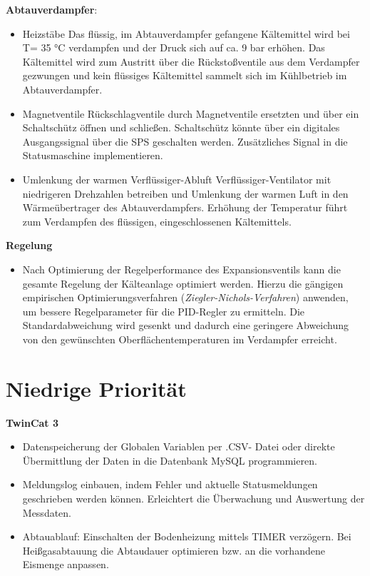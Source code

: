 \textbf{Abtauverdampfer}: 
	\begin{itemize}
\item  Heizstäbe \newline
Das flüssig, im Abtauverdampfer gefangene Kältemittel  wird bei T= 35 °C  verdampfen und der Druck sich auf ca. 9 bar erhöhen. Das Kältemittel wird zum Austritt über die Rückstoßventile aus dem Verdampfer gezwungen und kein flüssiges Kältemittel sammelt sich im Kühlbetrieb im Abtauverdampfer.


\item Magnetventile \newline
 Rückschlagventile durch Magnetventile ersetzten und über ein Schaltschütz öffnen und schließen. Schaltschütz könnte über ein digitales Ausgangssignal über die SPS geschalten werden. Zusätzliches Signal in die Statusmaschine implementieren. 

\item Umlenkung der warmen Verflüssiger-Abluft \newline
Verflüssiger-Ventilator mit niedrigeren Drehzahlen betreiben und Umlenkung der warmen Luft in den Wärmeübertrager des Abtauverdampfers. Erhöhung der Temperatur führt zum Verdampfen des flüssigen, eingeschlossenen Kältemittels. 
\end{itemize}	

\textbf{Regelung}
	\begin{itemize}
	\item Nach Optimierung der Regelperformance des Expansionsventils kann die gesamte Regelung der Kälteanlage optimiert werden. Hierzu die gängigen empirischen Optimierungsverfahren (\textit{Ziegler-Nichols-Verfahren}) anwenden, um bessere Regelparameter für die PID-Regler zu ermitteln. Die Standardabweichung wird gesenkt und dadurch eine geringere Abweichung von den gewünschten Oberflächentemperaturen im Verdampfer erreicht. 
	\end{itemize}

\section*{Niedrige Priorität}

\textbf{TwinCat 3} 
\begin{itemize}
\item Datenspeicherung der Globalen Variablen per .CSV- Datei oder direkte Übermittlung der Daten in die Datenbank MySQL programmieren. 
\item Meldungslog einbauen, indem Fehler und aktuelle Statusmeldungen geschrieben werden können. Erleichtert die Überwachung und Auswertung der Messdaten.
\item Abtauablauf: Einschalten der Bodenheizung mittels TIMER verzögern. Bei Heißgasabtauung die Abtaudauer optimieren bzw. an die vorhandene Eismenge anpassen. 
\end{itemize}

